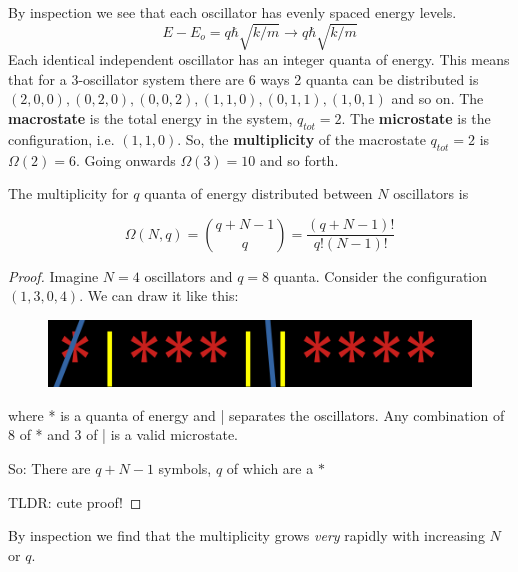 \documentclass[10pt]{article}
\begin{document}
By inspection we see that each oscillator has evenly spaced energy levels.
\begin{equation}
	E - E_o = q\hbar \sqrt{k/m}  \longrightarrow q\hbar \sqrt{k /m} 
	\label{eq:294:quantum_energy_level_harmonic_osc_spacing}
\end{equation}
Each identical independent oscillator has an integer quanta of energy.
This means that for a 3-oscillator system there are 6 ways 2 quanta can be distributed is $ (2,0,0), (0,2,0), (0,0,2), (1,1,0), (0,1,1), (1,0,1)$ and so on.
The \textbf{macrostate} is the total energy in the system, $ q_{tot} = 2 $.
The \textbf{microstate}  is the configuration, i.e. $ (1,1,0) $. So, the \textbf{multiplicity} of the macrostate $ q_{tot} = 2 $  is $ \Omega(2) = 6 $.
Going onwards $ \Omega(3) = 10 $ and so forth.

\begin{theorem}
	The multiplicity for $ q $  quanta of energy distributed between $ N $  oscillators is 

	\begin{equation}
		\Omega(N, q) = \binom{q + N - 1}{q} = \frac{(q + N -1)!}{q!(N-1)!}
		\label{eq:294:quanta_dist}
	\end{equation}

	\begin{proof}
		Imagine $ N = 4 $  oscillators and $ q=8 $ quanta.
		Consider the configuration $ (1,3,0,4) $. We can draw it like this:
		\begin{figure}[H]
			\centering
			\includegraphics[width=0.8\linewidth]{img/image_2022-03-07-12-28-40.png}
		\end{figure}
		where * is a quanta of energy and | separates the oscillators. 
		Any combination of 8 of * and 3 of | is a valid microstate.

		So: There are $ q + N - 1$  symbols, $ q $  of which are a $ * $ 

		TLDR: cute proof!
	\end{proof}

\end{theorem}

By inspection we find that the multiplicity grows \textit{very} rapidly with increasing $ N $  or $ q $. 
\end{document}
